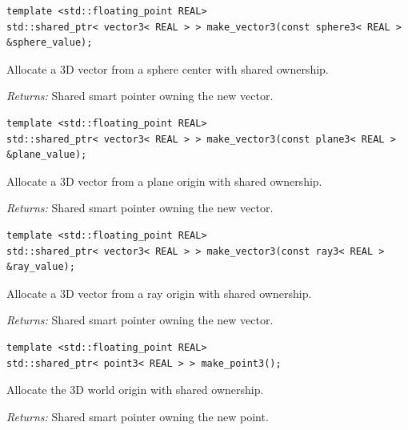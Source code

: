 \par\noindent\begin{minipage}{\linewidth}
\begin{lstlisting}[style=apireference]
template <std::floating_point REAL>
std::shared_ptr< vector3< REAL > > make_vector3(const sphere3< REAL > &sphere_value);
\end{lstlisting}
{\footnotesize Allocate a 3D vector from a sphere center with shared ownership.\par}
{\footnotesize\textit{Returns:} Shared smart pointer owning the new vector.\par}
\end{minipage}\par\vspace{1pt}
\par\noindent\begin{minipage}{\linewidth}
\begin{lstlisting}[style=apireference]
template <std::floating_point REAL>
std::shared_ptr< vector3< REAL > > make_vector3(const plane3< REAL > &plane_value);
\end{lstlisting}
{\footnotesize Allocate a 3D vector from a plane origin with shared ownership.\par}
{\footnotesize\textit{Returns:} Shared smart pointer owning the new vector.\par}
\end{minipage}\par\vspace{1pt}
\par\noindent\begin{minipage}{\linewidth}
\begin{lstlisting}[style=apireference]
template <std::floating_point REAL>
std::shared_ptr< vector3< REAL > > make_vector3(const ray3< REAL > &ray_value);
\end{lstlisting}
{\footnotesize Allocate a 3D vector from a ray origin with shared ownership.\par}
{\footnotesize\textit{Returns:} Shared smart pointer owning the new vector.\par}
\end{minipage}\par\vspace{1pt}
\par\noindent\begin{minipage}{\linewidth}
\begin{lstlisting}[style=apireference]
template <std::floating_point REAL>
std::shared_ptr< point3< REAL > > make_point3();
\end{lstlisting}
{\footnotesize Allocate the 3D world origin with shared ownership.\par}
{\footnotesize\textit{Returns:} Shared smart pointer owning the new point.\par}
\end{minipage}\par\vspace{1pt}
